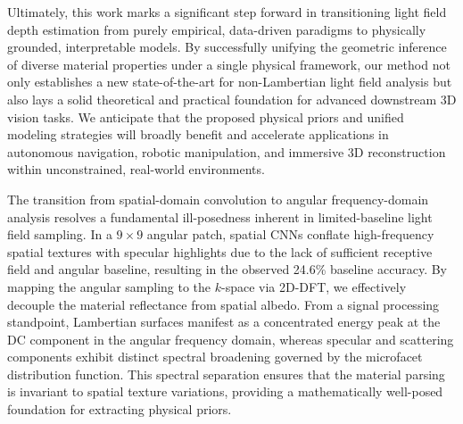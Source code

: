 Ultimately, this work marks a significant step forward in transitioning light field depth estimation from purely empirical, data-driven paradigms to physically grounded, interpretable models. By successfully unifying the geometric inference of diverse material properties under a single physical framework, our method not only establishes a new state-of-the-art for non-Lambertian light field analysis but also lays a solid theoretical and practical foundation for advanced downstream 3D vision tasks. We anticipate that the proposed physical priors and unified modeling strategies will broadly benefit and accelerate applications in autonomous navigation, robotic manipulation, and immersive 3D reconstruction within unconstrained, real-world environments.


The transition from spatial-domain convolution to angular frequency-domain analysis resolves a fundamental ill-posedness inherent in limited-baseline light field sampling. In a $9 \times 9$ angular patch, spatial CNNs conflate high-frequency spatial textures with specular highlights due to the lack of sufficient receptive field and angular baseline, resulting in the observed 24.6\% baseline accuracy. By mapping the angular sampling to the $k$-space via 2D-DFT, we effectively decouple the material reflectance from spatial albedo. From a signal processing standpoint, Lambertian surfaces manifest as a concentrated energy peak at the DC component in the angular frequency domain, whereas specular and scattering components exhibit distinct spectral broadening governed by the microfacet distribution function. This spectral separation ensures that the material parsing is invariant to spatial texture variations, providing a mathematically well-posed foundation for extracting physical priors.

